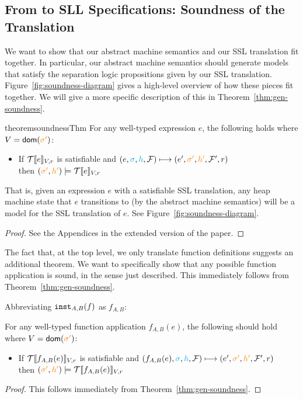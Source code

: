 \subsection{From \tool to SLL Specifications: Soundness of the Translation}
\label{sec:soundness}

We want to show that our abstract machine semantics and our SSL
translation fit together. In particular, our abstract machine
semantics should generate models that satisfy the separation logic
propositions given by our SSL translation.
Figure~\ref{fig:soundness-diagram} gives a high-level overview of how
these pieces fit together. We will give a more specific description of
this in Theorem~\ref{thm:gen-soundness}.



\begin{restatable}[Soundness]{theorem}{soundnessThm} \label{thm:gen-soundness}
  For any well-typed expression $e$, the following holds where $V = \textsf{dom}({\color{orange} \sigma'})$:
  \begin{itemize}
    \item If $\mathcal{T}\llbracket e\rrbracket_{V, r}$ is satisfiable and $(e, {\color{cyan} \sigma}, {\color{cyan} h}, \mathcal{F}) \longmapsto (e', {\color{orange} \sigma'}, {\color{orange} h'}, \mathcal{F}', r)$\\
          then $({\color{orange} \sigma'}, {\color{orange} h'}) \models \mathcal{T}\llbracket e\rrbracket_{V, r}$
  \end{itemize}
  That is, given an expression $e$ with a satisfiable SSL translation, any heap machine state that $e$ transitions to (by the abstract machine semantics) will
  be a model for the SSL translation of $e$. See Figure~\ref{fig:soundness-diagram}.
\end{restatable}

\begin{proof}
  See the Appendices
  in the extended version of the paper.
\end{proof}

The fact that, at the top level, we only translate function definitions suggests an additional theorem. We want to specifically
show that any possible function application is sound, in the sense just described. This immediately follows from Theorem~\ref{thm:gen-soundness}.

Abbreviating $\texttt{inst}_{A,B}(f)$ as $f_{A,B}$:

\begin{theorem} \label{thm:fn-soundness}
  For any well-typed function application $f_{A,B}(e)$, the following should hold where $V = \textsf{dom}({\color{orange} \sigma'})$:
  \begin{itemize}
    \item If $\mathcal{T}\llbracket f_{A,B}(e)\rrbracket_{V, r}$ is satisfiable and $(f_{A,B}(e), {\color{cyan} \sigma}, {\color{cyan} h}, \mathcal{F}) \longmapsto (e', {\color{orange} \sigma'}, {\color{orange} h'}, \mathcal{F}', r)$\\
          then $({\color{orange} \sigma'}, {\color{orange} h'}) \models \mathcal{T}\llbracket f_{A,B}(e)\rrbracket_{V, r}$
  \end{itemize}
\end{theorem}

\begin{proof}
  This follows immediately from Theorem~\ref{thm:gen-soundness}.
\end{proof}
